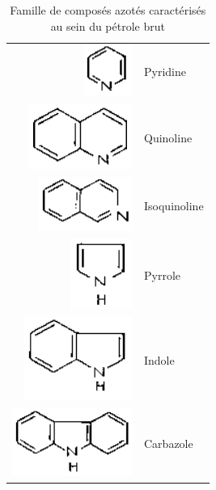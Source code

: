 \begin{table}[h!]
	\begin{center}
		\begin{tabular}{rl}
			\hline
			\includegraphics[scale=0.6]{image/pyridine} & Pyridine \\
			\includegraphics[scale=0.6]{image/quinoline} & Quinoline \\
			\includegraphics[scale=0.6]{image/isoquinoline} & Isoquinoline \\
			\includegraphics[scale=0.6]{image/pyrrole} & Pyrrole \\
			\includegraphics[scale=0.6]{image/indole} & Indole \\
			\includegraphics[scale=0.6]{image/carbazole} & Carbazole \\
			\hline 
		\end{tabular}
	\end{center}
	\caption{Famille de composés azotés caractérisés au sein du pétrole brut}
	\label{tab:azote}
\end{table}


